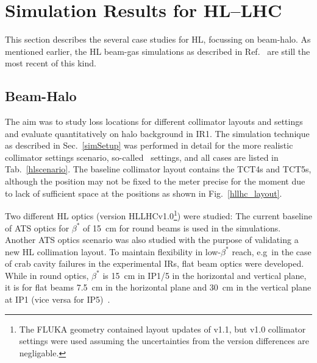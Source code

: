 \section{Simulation Results for HL--LHC\label{hllhcResults}}


This section describes the several case studies for HL, focussing on beam-halo. As mentioned earlier, the HL beam-gas simulations as described in Ref.~\cite{ipac2014_rkh} are still the most recent of this kind.

\subsection{Beam-Halo}

The aim was to study loss locations for different collimator layouts and settings and evaluate quantitatively on halo background in IR1. The simulation technique as described in Sec.~\ref{simSetup} was performed in detail for the more realistic collimator settings scenario, so-called \twosigmaret~settings, and all cases are listed in Tab.~\ref{hlscenario}. The baseline collimator layout contains the TCT4s and TCT5s, although the position may not be fixed to the meter precise for the moment due to lack of sufficient space at the positions as shown in Fig.~\ref{hllhc_layout}. 

Two different HL optics (version HLLHCv1.0\footnote{The FLUKA geometry contained layout updates of v1.1, but v1.0 collimator settings were used assuming the uncertainties from the version differences are negligable.}) were studied:
The current baseline of ATS optics for $\beta^{*}$ of 15~cm for round beams is used in the simulations.
Another ATS optics scenario was also studied with the purpose of validating a new HL collimation layout. To maintain flexibility in low-$\beta^*$ reach, e.g~in the case of crab cavity failures in the experimental IRs, flat beam optics were developed. While in round optics, $\beta^*$ is 15~cm in IP1/5 in the horizontal and vertical plane, it is for flat beams 7.5~cm in the horizontal plane and 30~cm in the vertical plane at IP1 (vice versa for IP5)~\cite{opticsWebRef}. 


